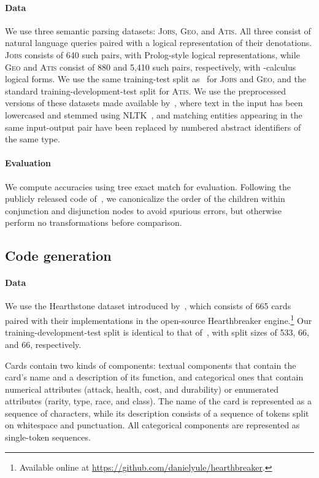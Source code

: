 \documentclass[11pt,a4paper]{article}
\newcommand{\Geo}{\textsc{Geo}\xspace}
\newcommand{\Jobs}{\textsc{Jobs}\xspace}
\newcommand{\Atis}{\textsc{Atis}\xspace}
\newcommand{\HS}{{\sc Hearthstone}\xspace}
\begin{document}
\paragraph{Data} We use three semantic parsing datasets: \Jobs, \Geo, and \Atis. All three consist of natural language queries paired with a logical representation of their denotations. \Jobs consists of 640 such pairs, with Prolog-style logical representations, while \Geo and \Atis consist of 880 and 5,410 such pairs, respectively, with -calculus logical forms. We use the same training-test split as~\citet{Zettlemoyer05Semantic} for \Jobs and \Geo, and the standard training-development-test split for \Atis. We use the preprocessed versions of these datasets made available by~\citet{Dong16Semantic}, where text in the input has been lowercased and stemmed using NLTK~\citep{Bird09NLP}, and matching entities appearing in the same input-output pair have been replaced by numbered abstract identifiers of the same type.

\paragraph{Evaluation} We compute accuracies using tree exact match for evaluation. Following the publicly released code of~\citet{Dong16Semantic}, we canonicalize the order of the children within conjunction and disjunction nodes to avoid spurious errors, but otherwise perform no transformations before comparison.

\subsection{Code generation}

\paragraph{Data} We use the \HS dataset introduced by~\citet{Ling16Code}, which consists of 665 cards paired with their implementations in the open-source Hearthbreaker engine.\footnote{Available online at \url{https://github.com/danielyule/hearthbreaker}.}
Our training-development-test split is identical to that of~\citet{Ling16Code}, with split sizes of 533, 66, and 66, respectively.

Cards contain two kinds of components: textual components that contain the card's name and a description of its function, and categorical ones that contain numerical attributes (attack, health, cost, and durability) or enumerated attributes (rarity, type, race, and class). The name of the card is represented as a sequence of characters, while its description consists of a sequence of tokens split on whitespace and punctuation. All categorical components are represented as single-token sequences.
\end{document}
